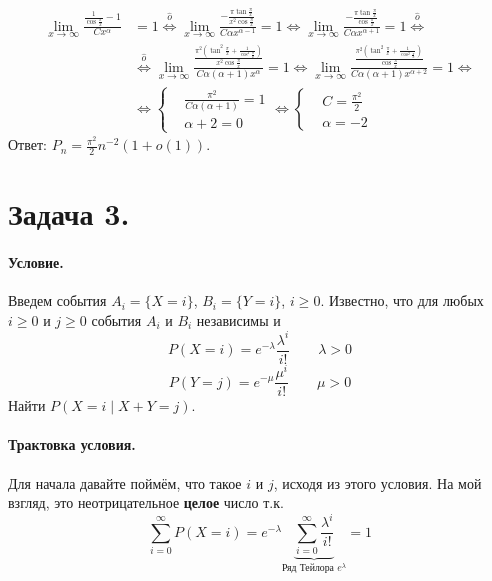 \documentclass{article}
\begin{document}
    \[\begin{split}
        \lim\limits_{x\to\infty}\frac{\frac1{\cos\frac\pi x}-1}{Cx^\alpha}&=1\overset{\hat o}\Leftrightarrow
        \lim\limits_{x\to\infty}\frac{-\frac{\pi\tan\frac\pi x}{x^2\cos\frac\pi x}}{C\alpha x^{\alpha-1}}=1\Leftrightarrow
        \lim\limits_{x\to\infty}\frac{-\frac{\pi\tan\frac\pi x}{\cos\frac\pi x}}{C\alpha x^{\alpha+1}}=1\overset{\hat o}\Leftrightarrow\\
        &\overset{\hat o}\Leftrightarrow
        \lim\limits_{x\to\infty}\frac{\frac{\pi^2\left(\tan^2\frac\pi x+\frac1{\cos^2\frac\pi x}\right)}{x^2\cos\frac\pi x}}{C\alpha(\alpha+1) x^{\alpha}}=1\Leftrightarrow
        \lim\limits_{x\to\infty}\frac{\frac{\pi^2\left(\tan^2\frac\pi x+\frac1{\cos^2\frac\pi x}\right)}{\cos\frac\pi x}}{C\alpha(\alpha+1) x^{\alpha+2}}=1\Leftrightarrow\\
        &\Leftrightarrow
        \left\{\begin{aligned}
            &\frac{\pi^2}{C\alpha(\alpha+1)}=1\\&\alpha+2=0
        \end{aligned}\right.
        \Leftrightarrow
        \left\{\begin{aligned}
            &C=\frac{\pi^2}2\\&\alpha=-2
        \end{aligned}\right.
    \end{split}\]
    Ответ: $P_n=\frac{\pi^2}2n^{-2}(1+o(1))$.
    \section{Задача 3.}
    \paragraph{Условие.}
    Введем события $A_i=\{X=i\}$, $B_i=\{Y=i\}$, $i\geqslant0$. Известно, что для любых $i\geqslant0$ и $j\geqslant0$ события $A_i$ и $B_i$ независимы и
    $$
    P(X=i)=e^{-\lambda}\frac{\lambda^i}{i!}\qquad \lambda>0
    $$
    $$
    P(Y=j)=e^{-\mu}\frac{\mu^i}{i!}\qquad \mu>0
    $$
    Найти $P(X=i\mid X+Y=j)$.
    \paragraph{Трактовка условия.}
    Для начала давайте поймём, что такое $i$ и $j$, исходя из этого условия. На мой взгляд, это неотрицательное \textbf{целое} число т.к.
    $$
    \sum\limits_{i=0}^\infty P(X=i)=e^{-\lambda}\underbrace{\sum\limits_{i=0}^\infty \frac{\lambda^i}{i!}}_{\text{Ряд Тейлора }e^{\lambda}}=1
    $$
\end{document}
